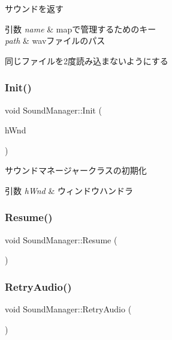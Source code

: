 サウンドを返す 


\begin{DoxyParams}{引数}
{\em name} & mapで管理するためのキー \\
\hline
{\em path} & wavファイルのパス\\
\hline
\end{DoxyParams}
同じファイルを2度読み込まないようにする \mbox{\label{class_sound_manager_adab2bc016911756ffd973c7d781b5cfb}} 
\subsubsection{\texorpdfstring{Init()}{Init()}}
{\footnotesize\ttfamily void Sound\+Manager\+::\+Init (\begin{DoxyParamCaption}\item[{H\+W\+ND}]{h\+Wnd }\end{DoxyParamCaption})}



サウンドマネージャークラスの初期化 


\begin{DoxyParams}{引数}
{\em h\+Wnd} & ウィンドウハンドラ \\
\hline
\end{DoxyParams}
\mbox{\label{class_sound_manager_a6107940d2299131fbd7991a4f222491b}} 
\subsubsection{\texorpdfstring{Resume()}{Resume()}}
{\footnotesize\ttfamily void Sound\+Manager\+::\+Resume (\begin{DoxyParamCaption}{ }\end{DoxyParamCaption})\hspace{0.3cm}{\ttfamily [inline]}}

\mbox{\label{class_sound_manager_acc9fb61509f30c7eb9136386eeeb9f94}} 
\subsubsection{\texorpdfstring{Retry\+Audio()}{RetryAudio()}}
{\footnotesize\ttfamily void Sound\+Manager\+::\+Retry\+Audio (\begin{DoxyParamCaption}{ }\end{DoxyParamCaption})\hspace{0.3cm}{\ttfamily [inline]}}

